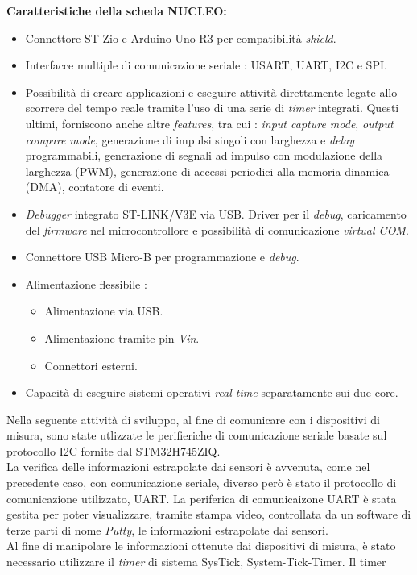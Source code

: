 \documentclass[11pt]{report}
\begin{document}
\textbf{Caratteristiche della scheda NUCLEO:}
\begin{itemize}
    \item Connettore ST Zio e Arduino Uno R3 per compatibilità \textit{shield}.
    \item Interfacce multiple di comunicazione seriale : USART, UART, I2C e SPI.
    \item Possibilità di creare applicazioni e eseguire attività direttamente legate allo scorrere del tempo reale tramite l'uso di una serie di \textit{timer} integrati. Questi ultimi, forniscono anche altre  \textit{features}, tra cui : \textit{input capture mode}, \textit{output compare mode}, generazione di impulsi singoli con larghezza e \textit{delay} programmabili, generazione di segnali ad impulso con modulazione della larghezza (PWM), generazione di accessi periodici alla memoria dinamica (DMA), contatore di eventi.
    \item \textit{Debugger} integrato ST-LINK/V3E via USB. Driver per il \textit{debug}, caricamento del \textit{firmware} nel microcontrollore e possibilità di comunicazione \textit{virtual COM}.
    \item Connettore USB Micro-B per programmazione e \textit{debug}.
    \item Alimentazione flessibile :
    \begin{itemize}
        \item Alimentazione via USB.
        \item Alimentazione tramite pin \textit{Vin}.
        \item Connettori esterni.
    \end{itemize}
    \item Capacità di eseguire sistemi operativi \textit{real-time} separatamente sui due core.
\end{itemize}
Nella seguente attività di sviluppo, al fine di comunicare con i dispositivi di misura, sono state utlizzate le perifieriche di comunicazione seriale basate sul protocollo
I2C fornite dal STM32H745ZIQ. \\
La verifica delle informazioni estrapolate dai sensori è avvenuta, come nel precedente caso, con comunicazione seriale, diverso però è stato il
protocollo di comunicazione utilizzato, UART. La periferica di comunicaizone UART è stata gestita per poter visualizzare, tramite stampa video, controllata da un software di 
terze parti di nome \textit{Putty}, le informazioni estrapolate dai sensori.\\
Al fine di manipolare le informazioni ottenute dai dispositivi di misura, è stato necessario utilizzare il \textit{timer} di sistema SysTick, System-Tick-Timer. Il timer
\end{document}
